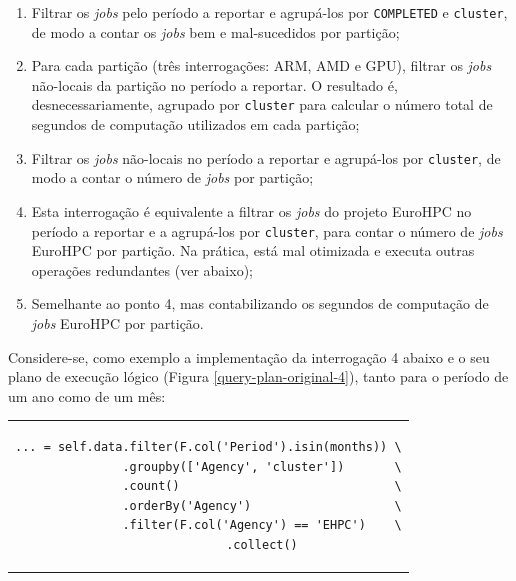 \documentclass[11pt, a4paper]{article}
\begin{document}
\begin{enumerate}
    \item Filtrar os \emph{jobs} pelo período a reportar e agrupá-los por \texttt{COMPLETED} e
          \texttt{cluster}, de modo a contar os \emph{jobs} bem e mal-sucedidos por partição;

    \item Para cada partição (três interrogações: ARM, AMD e GPU), filtrar os \emph{jobs} não-locais
          da partição no período a reportar. O resultado é, desnecessariamente, agrupado
          por \texttt{cluster} para calcular o número total de segundos de computação utilizados em
          cada partição;

    \item Filtrar os \emph{jobs} não-locais no período a reportar e agrupá-los por \texttt{cluster},
          de modo a contar o número de \emph{jobs} por partição;

    \item Esta interrogação é equivalente a filtrar os \emph{jobs} do projeto EuroHPC no período a
          reportar e a agrupá-los por \texttt{cluster}, para contar o número de \emph{jobs}
          EuroHPC por partição. Na prática, está mal otimizada e executa outras operações
          redundantes (ver abaixo);

    \item Semelhante ao ponto 4, mas contabilizando os segundos de computação de \emph{jobs} EuroHPC
          por partição.
\end{enumerate}

Considere-se, como exemplo a implementação da interrogação 4 abaixo e o seu plano de execução lógico
(Figura \ref{query-plan-original-4}), tanto para o período de um ano como de um mês:

\begin{center}
    \begin{tabular}{c}
        \begin{lstlisting}
... = self.data.filter(F.col('Period').isin(months)) \
               .groupby(['Agency', 'cluster'])       \
               .count()                              \
               .orderBy('Agency')                    \
               .filter(F.col('Agency') == 'EHPC')    \
               .collect()
        \end{lstlisting}
    \end{tabular}
\end{center}
\vspace{-\baselineskip}
\end{document}
